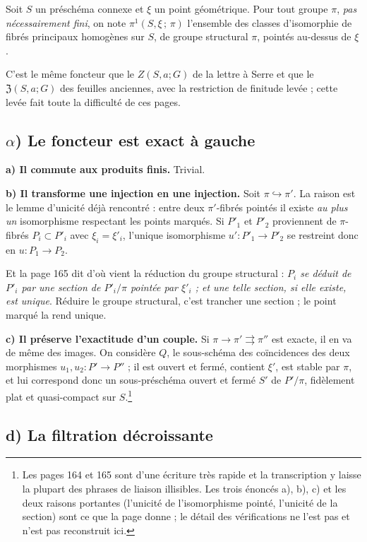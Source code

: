 \documentclass[11pt,a4paper]{article}
\begin{document}
Soit $S$ un préschéma connexe et $\xi$ un point géométrique. Pour tout groupe
$\pi$, \emph{pas nécessairement fini}, on note $\pi^{1}(S, \xi\,;\, \pi)$ l'ensemble des classes d'isomorphie de
fibrés principaux homogènes sur $S$, de groupe structural $\pi$, pointés
au-dessus de $\xi$.

C'est le même foncteur que le $Z(S,a;G)$ de la lettre à Serre et que le
$\mathfrak{Z}(S,a;G)$ des feuilles anciennes, avec la restriction de finitude
levée ; cette levée fait toute la difficulté de ces pages.

\subsection*{$\alpha$) Le foncteur est exact à gauche}

\textbf{a) Il commute aux produits finis.} Trivial.

\textbf{b) Il transforme une injection en une injection.} Soit
$\pi \hookrightarrow \pi'$. La raison est le lemme d'unicité déjà rencontré :
entre deux $\pi'$-fibrés pointés il existe \emph{au plus un} isomorphisme
respectant les points marqués. Si $P'_{1}$ et $P'_{2}$ proviennent de
$\pi$-fibrés $P_{i} \subset P'_{i}$ avec $\xi_{i} = \xi'_{i}$, l'unique
isomorphisme $u' : P'_{1} \to P'_{2}$ se restreint donc en
$u : P_{1} \to P_{2}$.

Et la page 165 dit d'où vient la réduction du groupe structural :
\emph{$P_{i}$ se déduit de $P'_{i}$ par une section de $P'_{i}/\pi$ pointée par
$\xi'_{i}$ ; et une telle section, si elle existe, est unique}. Réduire le
groupe structural, c'est trancher une section ; le point marqué la rend unique.

\textbf{c) Il préserve l'exactitude d'un couple.} Si
$\pi \to \pi' \rightrightarrows \pi''$ est exacte, il en va de même des images.
On considère $Q$, le sous-schéma des coïncidences des deux morphismes
$u_{1}, u_{2} : P' \to P''$ ; il est ouvert et fermé, contient $\xi'$, est
stable par $\pi$, et lui correspond donc un sous-préschéma ouvert et fermé
$S'$ de $P'/\pi$, fidèlement plat et quasi-compact sur
$S$.\footnote{Les pages 164 et 165 sont d'une écriture très rapide et la
transcription y laisse la plupart des phrases de liaison illisibles. Les trois
énoncés a), b), c) et les deux raisons portantes (l'unicité de l'isomorphisme
pointé, l'unicité de la section) sont ce que la page donne ; le détail des
vérifications ne l'est pas et n'est pas reconstruit ici.}

\subsection*{d) La filtration décroissante}
\end{document}
